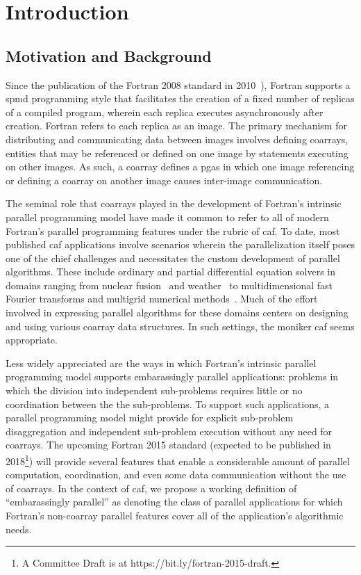 \section{Introduction}
\subsection{Motivation and Background}
Since the publication of the Fortran 2008 standard in 2010~\cite{iso2010information}), Fortran supports a \gls{spmd}
programming style that facilitates the creation of a fixed number of replicas of a compiled program, wherein each replica
executes asynchronously after creation.  Fortran refers to each replica as an image.  The primary mechanism for distributing and
communicating data between images involves defining \glspl{coarray}, entities that may be referenced or defined on one image by
statements executing on other images.  As such, a coarray defines a \gls{pgas} in which one image referencing or defining a
coarray on another image causes inter-image communication.

The seminal role that \glspl{coarray} played in the development of Fortran's intrinsic parallel programming model have made it
common to refer to all of modern Fortran's parallel programming features under the rubric of \gls{caf}.  To date, most
published \gls{caf} applications involve scenarios wherein the parallelization itself poses one of the chief
challenges and necessitates the custom development of parallel algorithms.  These include ordinary and partial differential
equation solvers in domains ranging from nuclear fusion~\cite{preissl2011multithreaded} and
weather~\cite{mozdzynski2015partitioned} to multidimensional fast Fourier transforms and multigrid numerical
methods~\cite{garain2015comparing}.  Much of the effort involved in
expressing parallel algorithms for these domains centers on
 designing and using various \gls{coarray} data structures.  In such settings, the moniker
\gls{caf} seems appropriate.

Less widely appreciated are the ways in which Fortran's intrinsic parallel programming model supports embarassingly parallel
applications: problems in which the division into independent sub-problems requires little or no coordination between the
the sub-problems. To support such applications, a parallel programming
model might provide for explicit sub-problem disaggregation and independent sub-problem execution without any need for \glspl{coarray}.  The upcoming Fortran 2015 standard
(expected to be published in 2018\footnote{A Committee Draft is at https://bit.ly/fortran-2015-draft.}) will provide several
features that enable a considerable amount of parallel computation, coordination, and even some data communication
without the use of \glspl{coarray}.  In the context of \gls{caf}, we propose a working definition of ``embarassingly parallel''
as denoting the class of parallel applications for which Fortran's non-\gls{coarray} parallel features cover all of the
application's algorithmic needs.

